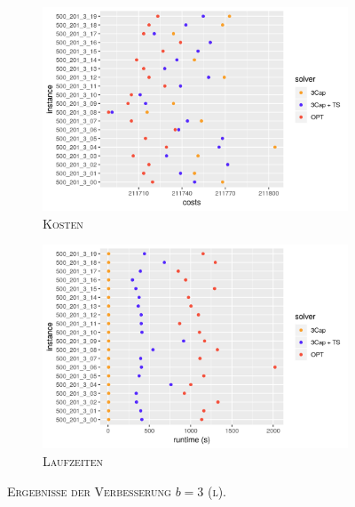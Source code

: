 \begin{figure}[H]
\centering
\begin{subfigure}[b]{0.49\textwidth}
\includegraphics[width=\textwidth]{img/imp_b=3_l_costs.png}
\caption{\textsc{Kosten}}
\label{fig:imp_b=3_l_costs}
\end{subfigure}
\hfill
\begin{subfigure}[b]{0.49\textwidth}
\includegraphics[width=\textwidth]{img/imp_b=3_l_runtimes.png}
\caption{\textsc{Laufzeiten}}
\label{fig:imp_b=3_l_runtimes}
\end{subfigure}
\caption{\textsc{Ergebnisse der Verbesserung $b = 3$ (l)}.}
\label{fig:imp_res_b=3_l}
\end{figure}

